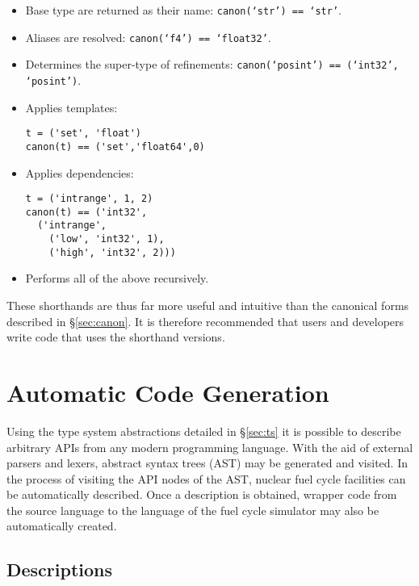 \documentclass{ansconfpaper}
\newcommand{\vin}[1]{\texttt{{#1}}}
\begin{document}
\begin{itemize}
\item Base type are returned as their name: \vin{canon(`str') == `str'}.

\item Aliases are resolved: \vin{canon(`f4') == `float32'}.

\item Determines the super-type of refinements: \vin{canon(`posint') == 
    (`int32', `posint')}.

\item Applies templates:
\begin{lstlisting}
t = ('set', 'float')
canon(t) == ('set','float64',0)
\end{lstlisting}

\item Applies dependencies:
\begin{lstlisting}    
t = ('intrange', 1, 2)
canon(t) == ('int32', 
  ('intrange', 
    ('low', 'int32', 1), 
    ('high', 'int32', 2)))
\end{lstlisting}

\item Performs all of the above recursively.
\end{itemize}

These shorthands are thus far more useful and intuitive than the canonical forms 
described in \S \ref{sec:canon}.  It is therefore recommended that users and 
developers write code that uses the shorthand versions.

\section{Automatic Code Generation}
\label{sec:codegen}

Using the type system abstractions detailed in \S \ref{sec:ts} it is possible
to describe arbitrary APIs from any modern programming language.  With the aid
of external parsers and lexers, abstract syntax trees (AST) may be generated 
and visited.  In the process of visiting the API nodes of the AST, nuclear 
fuel cycle facilities can be automatically described.  Once a description is 
obtained, wrapper code from the source language to the language of the fuel 
cycle simulator may also be automatically created.

\subsection{Descriptions}
\label{sec:desc}
\end{document}
